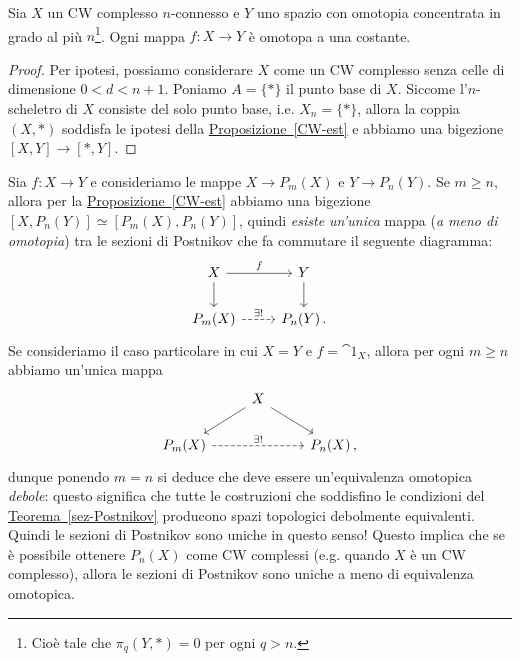 \begin{cor}
	Sia $X$ un CW complesso $n$-connesso e
	$Y$ uno spazio con omotopia concentrata in grado al più $n$\footnote{Cioè tale che $\pi_{q}(Y,\ast) = 0$ per ogni $q > n$.}.
	Ogni mappa $f:X \to Y$ è omotopa a una costante.
	\begin{proof}
		Per ipotesi, possiamo considerare $X$
		come un CW complesso senza celle di dimensione $0< d < n+1$.
		Poniamo $A = \{\ast\}$ il punto base di $X$.
		Siccome l'$n$-scheletro di $X$ consiste del solo punto base,
		i.e. $X_{n} = \{\ast\}$, allora la coppia $(X,\ast)$
		soddisfa le ipotesi della \hyperref[CW-est]{Proposizione~\ref{CW-est}}
		e abbiamo una bigezione $[X,Y] \to [\ast,Y]$.
	\end{proof}
\end{cor}

Sia $f:X \to Y$ e consideriamo le mappe $X \to P_{m}(X)$ e $Y \to P_{n}(Y)$.
Se $m \ge n$, allora per la \hyperref[CW-est]{Proposizione~\ref{CW-est}}
abbiamo una bigezione $[X,P_{n}(Y)] \simeq [P_{m}(X),P_{n}(Y)]$,
quindi \emph{esiste un'unica} mappa (\emph{a meno di omotopia}) tra
le sezioni di Postnikov che fa commutare il seguente diagramma:
\begin{equation*}
	\begin{tikzcd}
		X \ar[r, "f"] \ar[d] & Y \ar[d] \\
		P_{m}(X) \ar[r, "\exists !", dashed] & P_{n}(Y)\,.
	\end{tikzcd}
\end{equation*}
Se consideriamo il caso particolare in cui $X=Y$ e $f =\cat{1}_{X}$,
allora per ogni $m \ge n$ abbiamo un'unica mappa
\begin{equation*}
	\begin{tikzcd}
		& X \ar[dl] \ar[dr] & \\
		P_{m}(X) \ar[rr, dashed, "\exists !"] & & P_{n}(X)\,,
	\end{tikzcd}
\end{equation*}
dunque ponendo $m=n$ si deduce che deve essere un'equivalenza omotopica \emph{debole}:
questo significa che tutte le costruzioni 
che soddisfino le condizioni del \hyperref[sez-Postnikov]{Teorema~\ref{sez-Postnikov}}
producono spazi topologici debolmente equivalenti.
Quindi le sezioni di Postnikov sono uniche in questo senso!
Questo implica che se è possibile ottenere $P_{n}(X)$ 
come CW complessi (e.g. quando $X$ è un CW complesso),
allora le sezioni di Postnikov sono uniche a meno di equivalenza omotopica.

